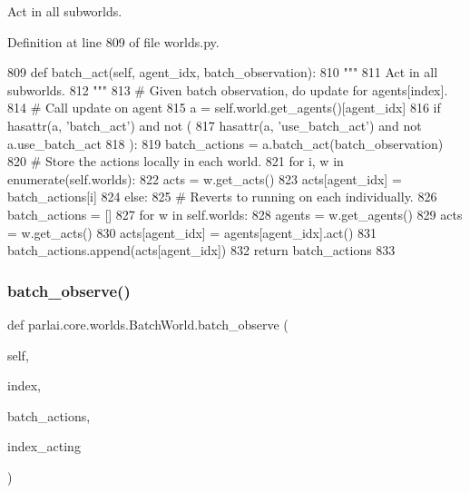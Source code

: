 \begin{DoxyVerb}Act in all subworlds.
\end{DoxyVerb}
 

Definition at line 809 of file worlds.\+py.


\begin{DoxyCode}
809     \textcolor{keyword}{def }batch\_act(self, agent\_idx, batch\_observation):
810         \textcolor{stringliteral}{"""}
811 \textcolor{stringliteral}{        Act in all subworlds.}
812 \textcolor{stringliteral}{        """}
813         \textcolor{comment}{# Given batch observation, do update for agents[index].}
814         \textcolor{comment}{# Call update on agent}
815         a = self.world.get\_agents()[agent\_idx]
816         \textcolor{keywordflow}{if} hasattr(a, \textcolor{stringliteral}{'batch\_act'}) \textcolor{keywordflow}{and} \textcolor{keywordflow}{not} (
817             hasattr(a, \textcolor{stringliteral}{'use\_batch\_act'}) \textcolor{keywordflow}{and} \textcolor{keywordflow}{not} a.use\_batch\_act
818         ):
819             batch\_actions = a.batch\_act(batch\_observation)
820             \textcolor{comment}{# Store the actions locally in each world.}
821             \textcolor{keywordflow}{for} i, w \textcolor{keywordflow}{in} enumerate(self.worlds):
822                 acts = w.get\_acts()
823                 acts[agent\_idx] = batch\_actions[i]
824         \textcolor{keywordflow}{else}:
825             \textcolor{comment}{# Reverts to running on each individually.}
826             batch\_actions = []
827             \textcolor{keywordflow}{for} w \textcolor{keywordflow}{in} self.worlds:
828                 agents = w.get\_agents()
829                 acts = w.get\_acts()
830                 acts[agent\_idx] = agents[agent\_idx].act()
831                 batch\_actions.append(acts[agent\_idx])
832         \textcolor{keywordflow}{return} batch\_actions
833 
\end{DoxyCode}
\mbox{\label{classparlai_1_1core_1_1worlds_1_1BatchWorld_a01faab842dc28b580dcaeacee491c5f5}} 
\subsubsection{\texorpdfstring{batch\+\_\+observe()}{batch\_observe()}}
{\footnotesize\ttfamily def parlai.\+core.\+worlds.\+Batch\+World.\+batch\+\_\+observe (\begin{DoxyParamCaption}\item[{}]{self,  }\item[{}]{index,  }\item[{}]{batch\+\_\+actions,  }\item[{}]{index\+\_\+acting }\end{DoxyParamCaption})}

